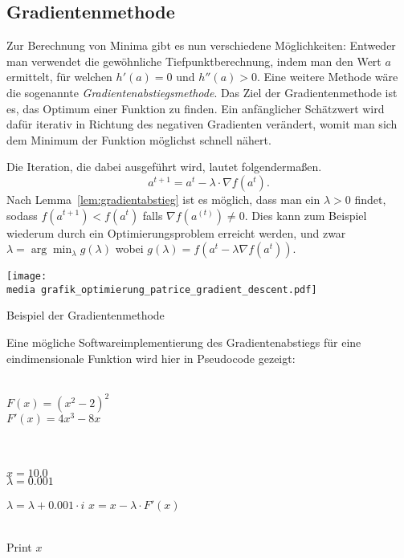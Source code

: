 \subsection{Gradientenmethode}

Zur Berechnung von Minima gibt es nun verschiedene Möglichkeiten:
Entweder man verwendet die gewöhnliche Tiefpunktberechnung, indem man den Wert $a$
 ermittelt, f\"ur welchen $h'(a)=0$ und $h''(a)>0$. 
Eine weitere Methode w\"are die sogenannte \emph{Gradientenabstiegsmethode}. Das Ziel der Gradientenmethode ist es, das Optimum einer Funktion zu finden. Ein anfänglicher Schätzwert wird dafür iterativ in Richtung des negativen Gradienten 
ver\"andert, womit man sich dem Minimum der Funktion möglichst schnell n\"ahert.

Die Iteration, die dabei ausgef\"uhrt wird, lautet folgenderma\ss en. 
\begin{equation*}
a^{t+1}  =a^{t} - \lambda \cdot \nabla  f(a^{t}).
\end{equation*}
Nach Lemma~\ref{lem:gradientabstieg} ist es m\"oglich, dass man ein $\lambda > 0$ findet, sodass $f(a^{t+1}) < f(a^{t})$ falls $ \nabla f(a^{(t)}) \neq 0$. 
Dies kann zum Beispiel wiederum durch ein Optimierungsproblem erreicht werden, und zwar $\lambda=\arg\min_{\lambda} g(\lambda)$ wobei $g(\lambda)=f(a^t-\lambda\nabla f(a^t))$.




\begin{dsafigure}
\begin{center}
\texttt{[image: \\media grafik\_optimierung\_patrice\_gradient\_descent.pdf]}
\label{figure:grafik_optimierung_patrice_gradient_descent}
\caption{Beispiel der Gradientenmethode}
\end{center}
\end{dsafigure}

Eine mögliche Softwareimplementierung des Gradientenabstiegs f\"ur eine eindimensionale Funktion wird hier in Pseudocode gezeigt:

\begin{algorithmic}[1]

   \\$F(x) = (x^2-2)^2$
\\$F'(x) = 4x^3-8x$

\\
\\$x = 10.0$
\\$\lambda = 0.001$

 \State $\lambda = \lambda+0.001\cdot i$
    \State $x = x - \lambda \cdot F'(x)$
  \EndFor
\EndFor
 
 
\\Print $x$\EndProcedure
\Statex
\end{algorithmic}

